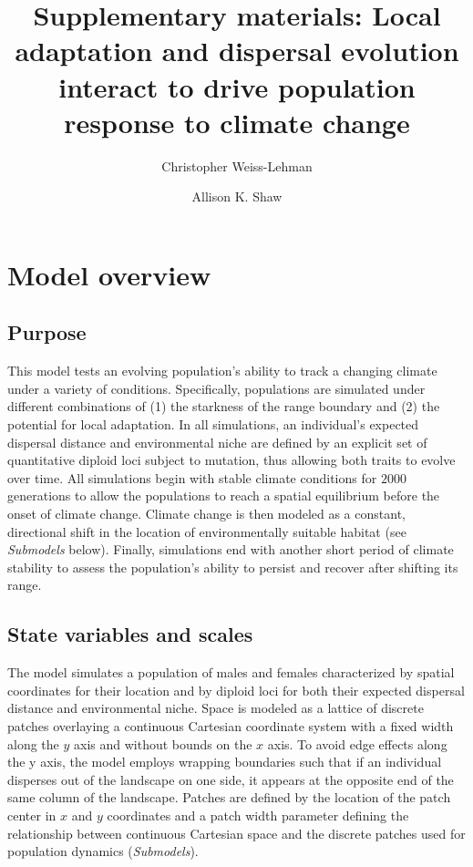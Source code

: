 \documentclass[12pt, oneside]{article}
\title{Supplementary materials: Local adaptation and dispersal evolution interact to drive population response to climate change}
\date{}
\author[1]{Christopher Weiss-Lehman}
\author[1]{Allison K. Shaw}
\affil[1]{Ecology, Evolution, and Behavior, University of Minnesota}
\begin{document}
\maketitle

\doublespacing
\linenumbers

\renewcommand{\thefigure}{S\arabic{figure}}
\renewcommand{\thetable}{S\arabic{table}}
\renewcommand{\theequation}{S\arabic{equation}}

\section*{Model overview}
\subsection*{Purpose} 
This model tests an evolving population's ability to track a changing climate under a variety of conditions. Specifically, populations are simulated under different combinations of (1) the starkness of the range boundary and (2) the potential for local adaptation. In all simulations, an individual's expected dispersal distance and environmental niche are defined by an explicit set of quantitative diploid loci subject to mutation, thus allowing both traits to evolve over time. All simulations begin with stable climate conditions for $2000$ generations to allow the populations to reach a spatial equilibrium before the onset of climate change. Climate change is then modeled as a constant, directional shift in the location of environmentally suitable habitat (see \textit{Submodels} below). Finally, simulations end with another short period of climate stability to assess the population's ability to persist and recover after shifting its range.

\subsection*{State variables and scales} 
The model simulates a population of males and females characterized by spatial coordinates for their location and by diploid loci for both their expected dispersal distance and environmental niche. Space is modeled as a lattice of discrete patches overlaying a continuous Cartesian coordinate system with a fixed width along the $y$ axis and without bounds on the $x$ axis. To avoid edge effects along the y axis, the model employs wrapping boundaries such that if an individual disperses out of the landscape on one side, it appears at the opposite end of the same column of the landscape. Patches are defined by the location of the patch center in $x$ and $y$ coordinates and a patch width parameter defining the relationship between continuous Cartesian space and the discrete patches used for population dynamics (\textit{Submodels}). 
\end{document}
